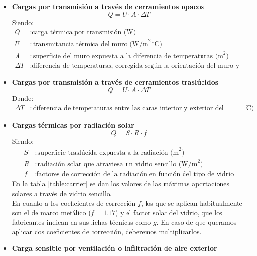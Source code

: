 \begin{itemize}
	\item \textbf{Cargas por transmisión a través de cerramientos opacos}
\begin{equation} \label{eq:carga_transmision_opacos}
	Q = U \cdot A \cdot \Delta T
\end{equation}
Siendo:
\begin{align*}
	Q & : \text{carga térmica por transmisión (W)} \\
	U & : \text{transmitancia térmica del muro (W/m}^2 \, ^\circ\text{C)} \\
	A & : \text{superficie del muro expuesta a la diferencia de temperaturas (m}^2\text{)} \\
\Delta T & : \text{diferencia de temperaturas, corregida según la orientación del muro y su peso}
\end{align*}

\item \textbf{Cargas por transmisión a través de cerramientos traslúcidos}
\begin{equation} \label{eq:carga_transmision_traslucidos}
	Q = U \cdot A \cdot \Delta T
\end{equation}
Donde:
\begin{align*}
	\Delta T & : \text{diferencia de temperaturas entre las caras interior y exterior del cerramiento (}^\circ\text{C)}
\end{align*}

\item \textbf{Cargas térmicas por radiación solar}
\begin{equation} \label{eq:carga_radiacion_solar}
	Q = S \cdot R \cdot f
\end{equation}
Siendo:
\begin{align*}
	S & : \text{superficie traslúcida expuesta a la radiación (m}^2\text{)} \\
	R & : \text{radiación solar que atraviesa un vidrio sencillo (W/m}^2\text{)} \\
	f & : \text{factores de corrección de la radiación en función del tipo de vidrio}
\end{align*}
En la tabla \ref{table:carrier} se dan los valores de las máximas aportaciones solares a través de vidrio sencillo.\\
En cuanto a los coeficientes de corrección $f$, los que se aplican habitualmente son el de marco metálico ($f = 1{.}17$) y el factor solar del vidrio, que los fabricantes indican en sus fichas técnicas como $g$. En caso de que queramos aplicar dos coeficientes de corrección, deberemos multiplicarlos.
\item \textbf{Carga sensible por ventilación o infiltración de aire exterior}


\end{itemize}
